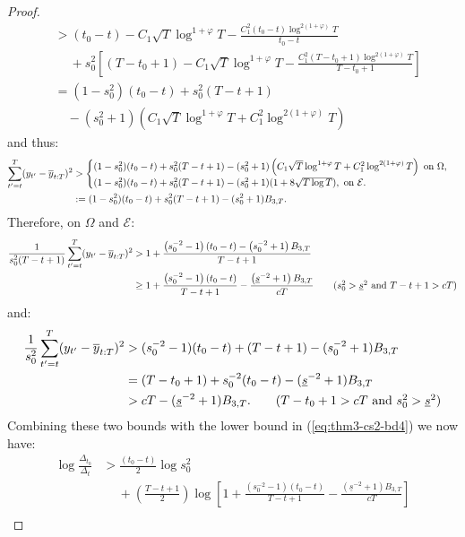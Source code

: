 \begin{proof}
\begin{align*}
    &> (t_0-t) - C_1\sqrt{T}\log^{1+\varphi} T - \frac{C^2_1 (t_0-t) \log^{2(1+\varphi)} T}{t_0-t} \\
    &\quad\: + s_0^2\left[(T-t_0+1) - C_1\sqrt{T}\log^{1+\varphi} T - \frac{ C^2_1 (T-t_0+1)\log^{2(1+\varphi)} T}{T-t_0+1}\right]\\ 
    &= (1-s_0^2)(t_0-t) + s_0^2(T-t+1) \\
    &\quad - (s_0^2 + 1)\left(C_1\sqrt{T}\log^{1+\varphi} T  + C^2_1\log^{2(1+\varphi)}T\right)
\end{align*}
\normalsize
and thus:
\begin{align*}
     \sum_{t'=t}^T (y_{t'} - \overline{y}_{t:T})^2 &> 
     \begin{cases}
        (1-s_0^2)(t_0-t) + s_0^2(T-t+1) - (s_0^2 + 1)\left(C_1\sqrt{T}\log^{1+\varphi} T  + C^2_1\log^{2(1+\varphi)}T\right) \text{ on } \Omega, \\
        (1-s_0^2)(t_0-t) + s_0^2(T-t+1) - (s_0^2 + 1)(1 +  8\sqrt{T \log T}), \text{ on } \mathcal{E}.
     \end{cases} \notag \\
     &:= (1-s_0^2)(t_0-t) + s_0^2(T-t+1) - (s_0^2 + 1) B_{3,T}.
\end{align*}
Therefore, on $\Omega$ and $\mathcal{E}$:
\begin{align}
     \frac{1}{s_0^2(T-t+1)}\sum_{t'=t}^T (y_{t'} - \overline{y}_{t:T})^2 &> 1 + \frac{\left(s_0^{-2} -1\right)(t_0 - t) - \left(s_0^{-2} + 1\right) B_{3,T}}{T - t + 1} \notag \\
     &\geq 1 + \frac{\left(s_0^{-2} -1\right)(t_0 - t)}{T - t + 1} - \frac{\left(\underline{s}^{-2} + 1\right) B_{3,T}}{cT} \tag{$s_0^2 > \underline{s}^2$ and $T-t+1 > cT$}
\end{align}
and:
\begin{align*}
     \frac{1}{s_0^2}\sum_{t'=t}^T (y_{t'} - \overline{y}_{t:T})^2 &> (s_0^{-2} -1)(t_0-t) + (T-t+1) - (s_0^{-2} + 1) B_{3,T} \\
     &= (T-t_0+1) + s_0^{-2}(t_0-t) - (\underline{s}^{-2} + 1) B_{3,T} \\
     &> cT - (\underline{s}^{-2} + 1) B_{3,T}.  \tag{$T-t_0+1 > cT$ and $s_0^2 > \underline{s}^2$}
\end{align*}
Combining these two bounds with the lower bound in (\ref{eq:thm3-cs2-bd4}) we now have:
\begin{align*}
    \log \frac{\Delta_{t_0}}{\Delta_t} &> \frac{(t_0-t)}{2}\log s_0^2  \\
    &\quad\: + \left(\frac{T - t +1}{2}\right)\log\left[1 + \frac{\left(s_0^{-2} -1\right)(t_0 - t)}{T - t + 1} - \frac{\left(\underline{s}^{-2} + 1\right) B_{3,T}}{cT} \right] \\

\end{align*}
\end{proof}
